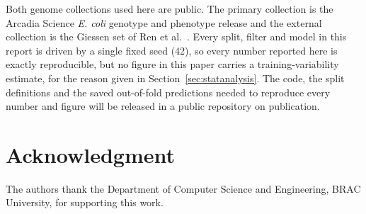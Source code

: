 \documentclass[journal]{IEEEtran}
\begin{document}
Both genome collections used here are public. The primary collection is the Arcadia
Science \textit{E. coli} genotype and phenotype release
\cite{morin2024ecoli,york2025amr} and the external collection is the Giessen set of
Ren et al.\ \cite{Ren2022}. Every split, filter and model in this report is driven by
a single fixed seed (42), so every number reported here is exactly reproducible, but
no figure in this paper carries a training-variability estimate, for the reason given
in Section~\ref{sec:statanalysis}. The code, the split definitions and the saved
out-of-fold predictions needed to reproduce every number and figure will be released
in a public repository on publication.

\section*{Acknowledgment}

The authors thank the Department of Computer Science and Engineering, BRAC
University, for supporting this work.
\end{document}
